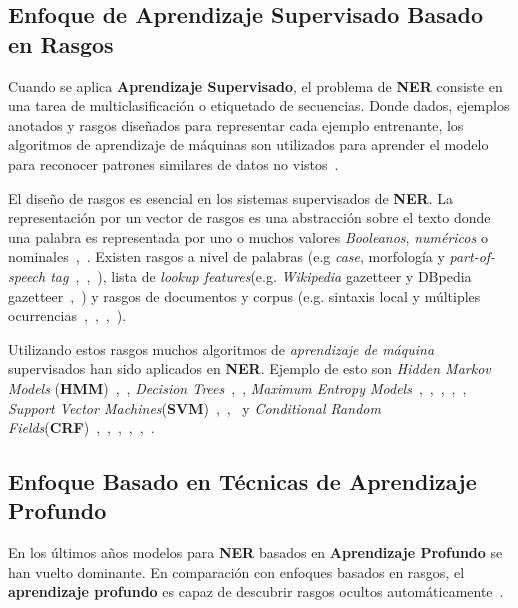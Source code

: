 \subsection{Enfoque de Aprendizaje Supervisado Basado en Rasgos}

Cuando se aplica \textbf{Aprendizaje Supervisado}, el problema de \textbf{NER} consiste en una tarea de multiclasificaci\'on o etiquetado de secuencias. Donde dados, ejemplos anotados y rasgos dise\~nados para representar cada ejemplo entrenante, los algoritmos de aprendizaje de m\'aquinas son utilizados para aprender el modelo para reconocer patrones similares de datos no vistos~\cite{li2018survey}.

El dise\~no de rasgos es esencial en los sistemas supervisados de \textbf{NER}. La representaci\'on por un vector de rasgos es una abstracci\'on sobre el texto donde una palabra es representada por uno o muchos valores \emph{Booleanos}, \emph{num\'ericos} o nominales~\cite{nadeau2007survey},~\cite{sekine2009named}. Existen rasgos a nivel de palabras (e.g \emph{case}, morfolog\'ia y \emph{part-of-speech tag}~\cite{zhou2002named},~\cite{settles2004biomedical},~\cite{liao2009simple}), lista de \emph{lookup features}(e.g. \emph{Wikipedia} gazetteer y DBpedia gazetteer~\cite{mikheev1999knowledge},~\cite{hoffart2011robust}) y rasgos de documentos y corpus (e.g. sintaxis local  y m\'ultiples ocurrencias~\cite{ravin1997extracting},~\cite{zhu2005espotter},~\cite{ji2016joint},~\cite{krishnan2006effective}).

Utilizando estos rasgos muchos algoritmos de \emph{aprendizaje de m\'aquina} supervisados han sido aplicados en \textbf{NER}. Ejemplo de esto son \emph{Hidden Markov Models} (\textbf{HMM})~\cite{bikel1997nymble},~\cite{bikel1999algorithm}, \emph{Decision Trees}~\cite{quinlan1986induction},~\cite{szarvas2006multilingual}, \emph{Maximum Entropy Models}~\cite{kapur1989maximum},~\cite{borthwick1998nyu},~\cite{bender2003maximum},~\cite{chieu2002named},~\cite{curran2003language}, \emph{Support Vector Machines}(\textbf{SVM})~\cite{hearst1998support},~\cite{isozaki2002efficient},~\cite{li2004svm} y \emph{Conditional Random Fields}(\textbf{CRF})~\cite{settles2004biomedical},~\cite{lafferty2001conditional},~\cite{mccallum2003early},~\cite{ritter2011named},~\cite{liu2011recognizing},~\cite{rocktaschel2012chemspot}.

\subsection{Enfoque Basado en T\'ecnicas de Aprendizaje Profundo}
En los \'ultimos a\~nos modelos para \textbf{NER} basados en \textbf{Aprendizaje Profundo} se han vuelto dominante. En comparaci\'on con enfoques basados en rasgos, el \textbf{aprendizaje profundo} es capaz de descubrir rasgos ocultos autom\'aticamente~\cite{li2018survey}.

